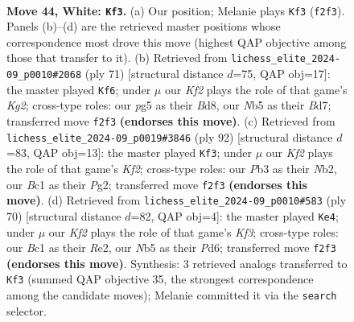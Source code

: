 \documentclass[11pt]{article}
\begin{document}
\clearpage

\begin{figure}[p]\centering
\begin{subfigure}{0.46\textwidth}\centering
\resizebox{\linewidth}{!}{%
\newchessgame
\chessboard[
  setfen={1nb2b2/1p6/1n6/pN1p1kp1/7p/PP2P2P/4PK2/2BB4 w - - 0 44},
  showmover=false,
  pgfstyle=straightmove, color=movearrow, markmove={f2-f3}
]}
\caption{}
\end{subfigure}\hfill
\begin{subfigure}{0.46\textwidth}\centering
\resizebox{\linewidth}{!}{%
\newchessgame
\chessboard[
  setfen={3b4/3b2k1/1p1N2pp/p4p2/2B1p3/1P2P1PP/P4P2/5K2 b - - 0 36},
  showmover=false,
  pgfstyle=straightmove, color=movearrow, markmove={g7-f6}
]}
\caption{}
\end{subfigure}
\\[4pt]
\begin{subfigure}{0.46\textwidth}\centering
\resizebox{\linewidth}{!}{%
\newchessgame
\chessboard[
  setfen={3b4/7p/b1k5/p2p2p1/P2P2P1/2B1P3/1N3KP1/8 w - - 1 47},
  showmover=false,
  pgfstyle=straightmove, color=movearrow, markmove={f2-f3}
]}
\caption{}
\end{subfigure}\hfill
\begin{subfigure}{0.46\textwidth}\centering
\resizebox{\linewidth}{!}{%
\newchessgame
\chessboard[
  setfen={8/1p1r1k2/p2P1b2/P1B3p1/1P4Pp/5K1P/4RP2/8 w - - 3 36},
  showmover=false,
  pgfstyle=straightmove, color=movearrow, markmove={f3-e4}
]}
\caption{}
\end{subfigure}
\caption{\textbf{Move 44, White: \texttt{Kf3}.} (a) Our position; Melanie plays \texttt{Kf3} (\texttt{f2f3}). Panels (b)--(d) are the retrieved master positions whose correspondence most drove this move (highest QAP objective among those that transfer to it). (b) Retrieved from \texttt{lichess\_elite\_2024-09\_p0010\#2068} (ply 71) [structural distance $d$=75, QAP obj=17]: the master played \texttt{Kf6}; under $\mu$ our \emph{Kf2} plays the role of that game's \emph{Kg2}; cross-type roles: our \emph{p}g5 as their \emph{B}d8, our \emph{N}b5 as their \emph{B}d7; transferred move \texttt{f2f3} \textbf{(endorses this move)}. (c) Retrieved from \texttt{lichess\_elite\_2024-09\_p0019\#3846} (ply 92) [structural distance $d$=83, QAP obj=13]: the master played \texttt{Kf3}; under $\mu$ our \emph{Kf2} plays the role of that game's \emph{Kf2}; cross-type roles: our \emph{P}b3 as their \emph{N}b2, our \emph{B}c1 as their \emph{P}g2; transferred move \texttt{f2f3} \textbf{(endorses this move)}. (d) Retrieved from \texttt{lichess\_elite\_2024-09\_p0010\#583} (ply 70) [structural distance $d$=82, QAP obj=4]: the master played \texttt{Ke4}; under $\mu$ our \emph{Kf2} plays the role of that game's \emph{Kf3}; cross-type roles: our \emph{B}c1 as their \emph{R}e2, our \emph{N}b5 as their \emph{P}d6; transferred move \texttt{f2f3} \textbf{(endorses this move)}. Synthesis: 3 retrieved analogs transferred to \texttt{Kf3} (summed QAP objective 35, the strongest correspondence among the candidate moves); Melanie committed it via the \texttt{search} selector.}
\label{fig:thought-m86}
\end{figure}
\end{document}
